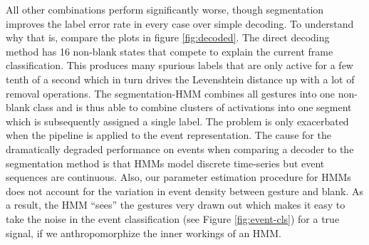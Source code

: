All other combinations perform significantly worse, though segmentation improves
the label error rate in every case over simple decoding. To understand why that
is, compare the plots in figure \ref{fig:decoded}. The direct decoding method
has 16 non-blank states that compete to explain the current frame
classification. This produces many spurious labels that are only active for a
few tenth of a second which in turn drives the Levenshtein distance up with a
lot of removal operations. The segmentation-HMM combines all gestures into one
non-blank class and is thus able to combine clusters of activations into one
segment which is subsequently assigned a single label. The problem is only
exacerbated when the pipeline is applied to the event representation. The cause
for the dramatically degraded performance on events when comparing a decoder to
the segmentation method is that HMMs model discrete time-series but event
sequences are continuous. Also, our parameter estimation procedure for HMMs does
not account for the variation in event density between gesture and blank. As a
result, the HMM ``sees'' the gestures very drawn out which makes it easy to take
the noise in the event classification (see Figure \ref{fig:event-cls}) for a
true signal, if we anthropomorphize the inner workings of an HMM.

